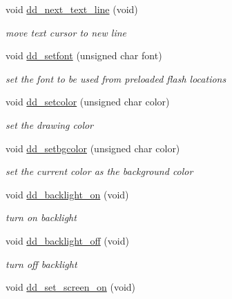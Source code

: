 \begin{DoxyCompactItemize}
void \hyperlink{group__display_gaef33ebb295da7922b27439cd181b3598}{dd\-\_\-next\-\_\-text\-\_\-line} (void)
\begin{DoxyCompactList}\small\item\em move text cursor to new line \end{DoxyCompactList}\item 
void \hyperlink{group__display_ga61bdf8470f0d64b1aee8700e74e24264}{dd\-\_\-setfont} (unsigned char font)
\begin{DoxyCompactList}\small\item\em set the font to be used from preloaded flash locations \end{DoxyCompactList}\item 
void \hyperlink{group__display_gad4f4f9bfc3b024f4d561de88337e9e6f}{dd\-\_\-setcolor} (unsigned char color)
\begin{DoxyCompactList}\small\item\em set the drawing color \end{DoxyCompactList}\item 
void \hyperlink{group__display_gad3a46b68468118bec6bac8e085614e43}{dd\-\_\-setbgcolor} (unsigned char color)
\begin{DoxyCompactList}\small\item\em set the current color as the background color \end{DoxyCompactList}\item 
\hypertarget{group__display_ga67f32f8cba110a28ce464d71acc53399}{void \hyperlink{group__display_ga67f32f8cba110a28ce464d71acc53399}{dd\-\_\-backlight\-\_\-on} (void)}\label{group__display_ga67f32f8cba110a28ce464d71acc53399}

\begin{DoxyCompactList}\small\item\em turn on backlight \end{DoxyCompactList}\item 
\hypertarget{group__display_ga7e782e79678f36dabaaf509071c05874}{void \hyperlink{group__display_ga7e782e79678f36dabaaf509071c05874}{dd\-\_\-backlight\-\_\-off} (void)}\label{group__display_ga7e782e79678f36dabaaf509071c05874}

\begin{DoxyCompactList}\small\item\em turn off backlight \end{DoxyCompactList}\item 
\hypertarget{group__display_ga7ee3fe530efeed2df71f53c0ed6c8b0b}{void \hyperlink{group__display_ga7ee3fe530efeed2df71f53c0ed6c8b0b}{dd\-\_\-set\-\_\-screen\-\_\-on} (void)}\label{group__display_ga7ee3fe530efeed2df71f53c0ed6c8b0b}


\end{DoxyCompactItemize}
